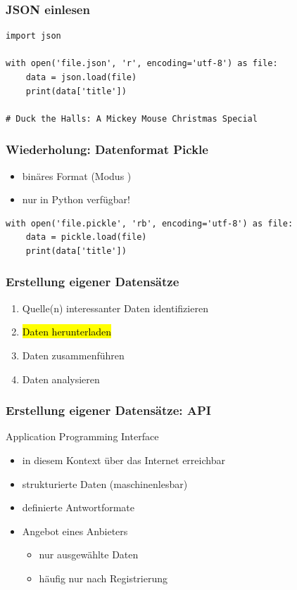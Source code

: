 \begin{frame}[fragile]
	\frametitle{JSON einlesen}

	\begin{verbatim}
import json

with open('file.json', 'r', encoding='utf-8') as file:
    data = json.load(file)
    print(data['title'])

# Duck the Halls: A Mickey Mouse Christmas Special
\end{verbatim}
\end{frame}

\begin{frame}[fragile]
	\frametitle{Wiederholung: Datenformat Pickle}
	
	\begin{itemize}
		\item \alert{binäres} Format (Modus )
		\item nur in Python verfügbar!
	\end{itemize}

	\begin{verbatim}
with open('file.pickle', 'rb', encoding='utf-8') as file:
    data = pickle.load(file)
    print(data['title'])
    \end{verbatim}
\end{frame}

\begin{frame}
	\frametitle{Erstellung eigener Datensätze}

	\begin{enumerate}
		\item Quelle(n) interessanter Daten identifizieren
		\item \hl{Daten herunterladen}
		\item Daten zusammenführen
		\item Daten analysieren
	\end{enumerate}
\end{frame}

\begin{frame}
	\frametitle{Erstellung eigener Datensätze: API}
	
	\alert{A}pplication \alert{P}rogramming \alert{I}nterface

	\begin{itemize}
		\item in diesem Kontext über das Internet erreichbar
		\item strukturierte Daten (maschinenlesbar)
		\item definierte Antwortformate
		\item Angebot eines Anbieters
		\begin{itemize}
			\item nur ausgewählte Daten
			\item häufig nur nach Registrierung
		\end{itemize}
	\end{itemize}
\end{frame}

